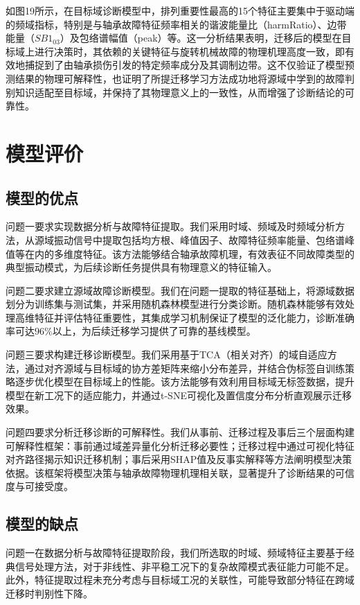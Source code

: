 \documentclass[a4paper]{CPIPC}
\numberwithin{equation}{section}
\begin{document}
如图19所示，在目标域诊断模型中，排列重要性最高的15个特征主要集中于驱动端的频域指标，特别是与轴承故障特征频率相关的谐波能量比（harmRatio）、边带能量（$SB1_{03}$）及包络谱幅值（peak）等。这一分析结果表明，迁移后的模型在目标域上进行决策时，其依赖的关键特征与旋转机械故障的物理机理高度一致，即有效地捕捉到了由轴承损伤引发的特定频率成分及其调制边带。这不仅验证了模型预测结果的物理可解释性，也证明了所提迁移学习方法成功地将源域中学到的故障判别知识适配至目标域，并保持了其物理意义上的一致性，从而增强了诊断结论的可靠性。

\newpage
\section{模型评价}
\subsection{模型的优点}
问题一要求实现数据分析与故障特征提取。我们采用时域、频域及时频域分析方法，从源域振动信号中提取包括均方根、峰值因子、故障特征频率能量、包络谱峰值等在内的多维度特征。该方法能够结合轴承故障机理，有效表征不同故障类型的典型振动模式，为后续诊断任务提供具有物理意义的特征输入。

问题二要求建立源域故障诊断模型。我们在问题一提取的特征基础上，将源域数据划分为训练集与测试集，并采用随机森林模型进行分类诊断。随机森林能够有效处理高维特征并评估特征重要性，其集成学习机制保证了模型的泛化能力，诊断准确率可达$96\%$以上，为后续迁移学习提供了可靠的基线模型。

问题三要求构建迁移诊断模型。我们采用基于TCA（相关对齐）的域自适应方法，通过对齐源域与目标域的协方差矩阵来缩小分布差异，并结合伪标签自训练策略逐步优化模型在目标域上的性能。该方法能够有效利用目标域无标签数据，提升模型在新工况下的适应能力，并通过t-SNE可视化及置信度分布分析直观展示迁移效果。

问题四要求分析迁移诊断的可解释性。我们从事前、迁移过程及事后三个层面构建可解释性框架：事前通过域差异量化分析迁移必要性；迁移过程中通过可视化特征对齐路径揭示知识迁移机制；事后采用SHAP值及反事实解释等方法阐明模型决策依据。该框架将模型决策与轴承故障物理机理相关联，显著提升了诊断结果的可信度与可接受度。

\subsection{模型的缺点}
问题一在数据分析与故障特征提取阶段，我们所选取的时域、频域特征主要基于经典信号处理方法，对于非线性、非平稳工况下的复杂故障模式表征能力可能不足。此外，特征提取过程未充分考虑与目标域工况的关联性，可能导致部分特征在跨域迁移时判别性下降。
\end{document}
